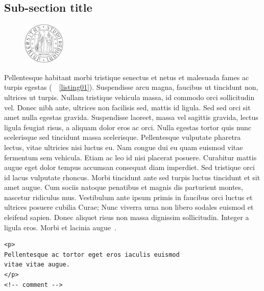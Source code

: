 \documentclass[a4paper, 12pt, twoside, openright]{book}
\begin{document}
\subsection{Sub-section title}
\begin{figure}
  \vspace{-20pt}
  \begin{center}
  \includegraphics[width=2cm]{images/unipd-bn.png}
  \end{center}
  \vspace{-10pt}
\end{figure}

Pellentesque habitant morbi tristique senectus et netus et malesuada fames ac turpis egestas (\seename\ \lstlistingname~\ref{listing01}). Suspendisse arcu magna, faucibus ut tincidunt non, ultrices ut turpis. Nullam tristique vehicula massa, id commodo orci sollicitudin vel. Donec nibh ante, ultrices non facilisis sed, mattis id ligula. Sed sed orci sit amet nulla egestas gravida. Suspendisse laoreet, massa vel sagittis gravida, lectus ligula feugiat risus, a aliquam dolor eros ac orci. Nulla egestas tortor quis nunc scelerisque sed tincidunt massa scelerisque. Pellentesque vulputate pharetra lectus, vitae ultricies nisi luctus eu. Nam congue dui eu quam euismod vitae fermentum sem vehicula. Etiam ac leo id nisi placerat posuere. Curabitur mattis augue eget dolor tempus accumsan consequat diam imperdiet. Sed tristique orci id lacus vulputate rhoncus. Morbi tincidunt ante sed turpis luctus tincidunt et sit amet augue. Cum sociis natoque penatibus et magnis dis parturient montes, nascetur ridiculus mus. Vestibulum ante ipsum primis in faucibus orci luctus et ultrices posuere cubilia Curae; Nunc viverra urna non libero sodales euismod et eleifend sapien. Donec aliquet risus non massa dignissim sollicitudin. Integer a ligula eros. Morbi et lacinia augue~\cite{bookname}.

\begin{lstlisting}[caption={caption text},label=listing01]
<p>
Pellentesque ac tortor eget eros iaculis euismod
vitae vitae augue.
</p>
<!-- comment -->
\end{lstlisting}


\backmatter

\begingroup %
  \makeatletter
  \let\ps@plain\ps@empty
  \makeatother
  
\endgroup
\end{document}
